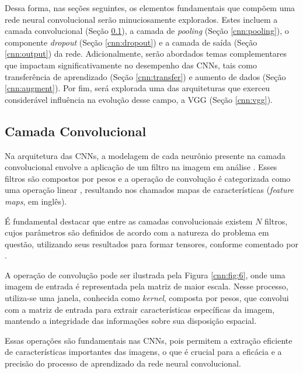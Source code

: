 Dessa forma, nas seções seguintes, os elementos fundamentais que compõem uma rede neural convolucional serão minuciosamente explorados. Estes incluem a camada convolucional (Seção \ref{cnn:conv}), a camada de \textit{pooling} (Seção \ref{cnn:pooling}), o componente \textit{dropout} (Seção \ref{cnn:dropout}) e a camada de saída (Seção \ref{cnn:output}) da rede. Adicionalmente, serão abordados temas complementares que impactam significativamente no desempenho das CNNs, tais como transferência de aprendizado (Seção \ref{cnn:transfer}) e aumento de dados (Seção \ref{cnn:augment}). Por fim, será explorada uma das arquiteturas que exerceu considerável influência na evolução desse campo, a VGG (Seção \ref{cnn:vgg}).


\subsection{Camada Convolucional}
\label{cnn:conv}

Na arquitetura das CNNs, a modelagem de cada neurônio presente na camada convolucional envolve a aplicação de um filtro na imagem em análise \citep{ponti2018funciona}. Esses filtros são compostos por pesos e a operação de convolução é categorizada como uma operação linear \citep{Goodfellow2016}, resultando nos chamados mapas de características (\textit{feature maps}, em inglês).

É fundamental destacar que entre as camadas convolucionais existem $N$ filtros, cujos parâmetros são definidos de acordo com a natureza do problema em questão, utilizando seus resultados para formar tensores, conforme comentado por \cite{ponti2018funciona}.

A operação de convolução pode ser ilustrada pela Figura \ref{cnn:fig:6}, onde uma imagem de entrada é representada pela matriz de maior escala. Nesse processo, utiliza-se uma janela, conhecida como \textit{kernel}, composta por pesos, que convolui com a matriz de entrada para extrair características específicas da imagem, mantendo a integridade das informações sobre sua disposição espacial.

Essas operações são fundamentais nas CNNs, pois permitem a extração eficiente de características importantes das imagens, o que é crucial para a eficácia e a precisão do processo de aprendizado da rede neural convolucional.

